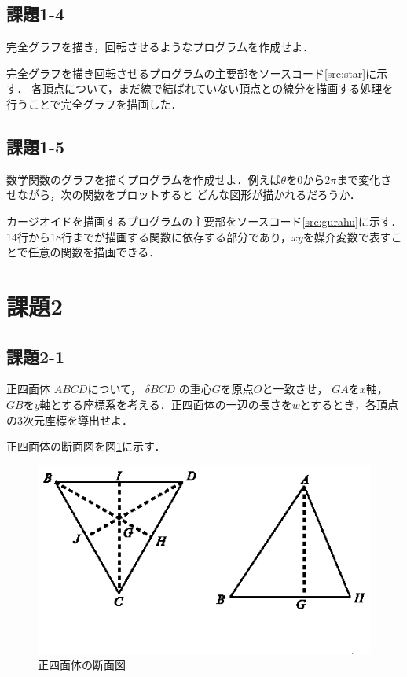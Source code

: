 \documentclass[twocolumn]{jsarticle}
\begin{document}
\subsection{課題1-4}
完全グラフを描き，回転させるようなプログラムを作成せよ．

完全グラフを描き回転させるプログラムの主要部をソースコード\ref{src:star}に示す．
各頂点について，まだ線で結ばれていない頂点との線分を描画する処理を行うことで完全グラフを描画した．



\subsection{課題1-5}
数学関数のグラフを描くプログラムを作成せよ．例えば$\theta$を$0$から$2\pi$まで変化させながら，次の関数をプロットすると
どんな図形が描かれるだろうか．

カージオイドを描画するプログラムの主要部をソースコード\ref{src:gurahu}に示す．
14行から18行までが描画する関数に依存する部分であり，$xy$を媒介変数で表すことで任意の関数を描画できる．



\section{課題2}
\subsection{課題2-1}
正四面体 $ABCD$について， $\delta BCD$ の重心$G$を原点$O$と一致させ，
$GA$を$x$軸， $GB$を$y$軸とする座標系を考える．正四面体の一辺の長さを$w$とするとき，各頂点の3次元座標を導出せよ．

正四面体の断面図を図\ref{tri}に示す．

\begin{figure}[h]
 \centering
 \includegraphics[width=1\hsize]{tri.eps}
\vspace{-13mm}
 \caption{正四面体の断面図}
 \label{tri}
\end{figure}
\end{document}
